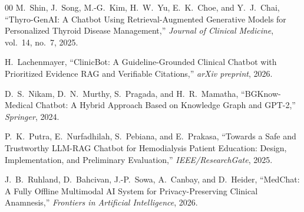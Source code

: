 \documentclass[10pt,conference]{IEEEtran}
\begin{document}
\begin{thebibliography}{00}
M.~Shin, J.~Song, M.-G.~Kim, H.~W.~Yu, E.~K.~Choe, and Y.~J.~Chai, ``Thyro-GenAI: A Chatbot Using Retrieval-Augmented Generative Models for Personalized Thyroid Disease Management,'' \emph{Journal of Clinical Medicine}, vol.~14, no.~7, 2025.

H.~Lachenmayer, ``ClinicBot: A Guideline-Grounded Clinical Chatbot with Prioritized Evidence RAG and Verifiable Citations,'' \emph{arXiv preprint}, 2026.

D.~S.~Nikam, D.~N.~Murthy, S.~Pragada, and H.~R.~Mamatha, ``BGKnow-Medical Chatbot: A Hybrid Approach Based on Knowledge Graph and GPT-2,'' \emph{Springer}, 2024.

P.~K.~Putra, E.~Nurfadhilah, S.~Pebiana, and E.~Prakasa, ``Towards a Safe and Trustworthy LLM-RAG Chatbot for Hemodialysis Patient Education: Design, Implementation, and Preliminary Evaluation,'' \emph{IEEE/ResearchGate}, 2025.

J.~B.~Ruhland, D.~Bahcivan, J.-P.~Sowa, A.~Canbay, and D.~Heider, ``MedChat: A Fully Offline Multimodal AI System for Privacy-Preserving Clinical Anamnesis,'' \emph{Frontiers in Artificial Intelligence}, 2026.

\end{thebibliography}
\end{document}
